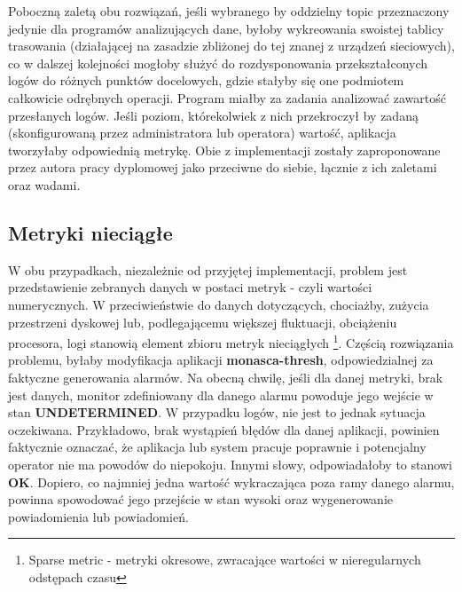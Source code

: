     Poboczną zaletą obu rozwiązań, jeśli wybranego by oddzielny topic przeznaczony jedynie dla programów analizujących dane, byłoby wykreowania
    swoistej tablicy trasowania (działającej na zasadzie zbliżonej do tej znanej z urządzeń sieciowych), co w dalszej kolejności mogłoby
    służyć do rozdysponowania przekształconych logów do różnych punktów docelowych, gdzie stałyby się one podmiotem całkowicie odrębnych operacji.
    Program miałby za zadania analizować zawartość przesłanych logów. Jeśli poziom, którekolwiek z nich przekroczył by zadaną (skonfigurowaną przez
    administratora lub operatora) wartość, aplikacja tworzyłaby odpowiednią metrykę.
    Obie z implementacji zostały zaproponowane przez autora pracy dyplomowej jako przeciwne do siebie, łącznie z ich zaletami oraz wadami.

    \subsection{Metryki nieciągłe}
    W obu przypadkach, niezależnie od przyjętej implementacji, problem jest przedstawienie zebranych danych w postaci metryk - czyli wartości
    numerycznych. W przeciwieństwie do danych dotyczących, chociażby, zużycia przestrzeni dyskowej lub, podlegającemu większej
    fluktuacji, obciążeniu procesora, logi stanowią element zbioru metryk nieciągłych \footnote{Sparse metric - metryki okresowe,
    zwracające wartości w nieregularnych odstępach czasu}. Częścią rozwiązania problemu, byłaby modyfikacja aplikacji \textbf{monasca-thresh},
    odpowiedzialnej za faktyczne generowania alarmów. Na obecną chwilę, jeśli dla danej metryki, brak jest danych, monitor zdefiniowany
    dla danego alarmu powoduje jego wejście w stan \textbf{UNDETERMINED}. W przypadku logów, nie jest to jednak sytuacja oczekiwana. 
    Przykładowo, brak wystąpień błędów dla danej aplikacji, powinien faktycznie oznaczać, że aplikacja lub system pracuje poprawnie i
    potencjalny operator nie ma powodów do niepokoju. Innymi słowy, odpowiadałoby to stanowi \textbf{OK}. Dopiero, co najmniej jedna wartość
    wykraczająca poza ramy danego alarmu, powinna spowodować jego przejście w stan wysoki oraz wygenerowanie powiadomienia lub powiadomień.